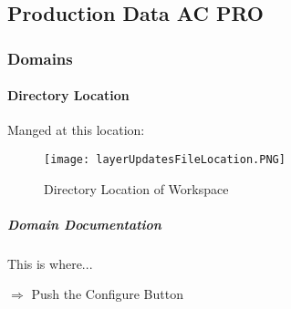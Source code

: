 \subsection[Production Data]{Production Data AC PRO}
\medskip







\subsubsection{Domains}
%
\paragraph[Directory Location]{Directory Location\texorpdfstring{\\}{}}
%
\noindent Manged at this location:
%
\begin{figure}[h!]
\centering
    \texttt{[image: layerUpdatesFileLocation.PNG]}

\caption{Directory Location of Workspace}
\end{figure}
%
%
%

\subparagraph[Domain Documentation]{Domain Documentation\texorpdfstring{\\}{}}
\noindent This is where...

{\Large $\Rightarrow$ Push the Configure Button}



